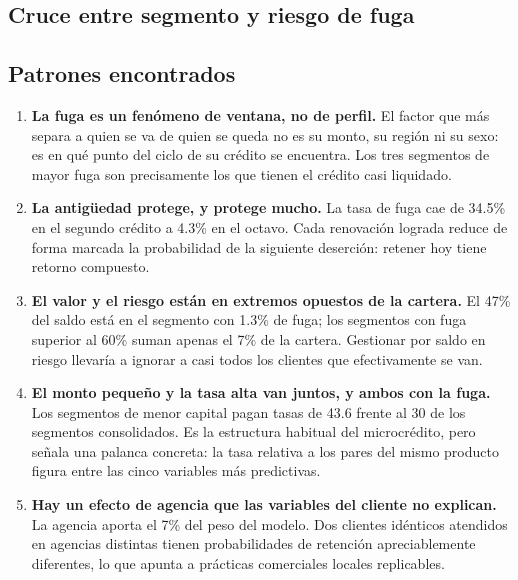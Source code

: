 \documentclass[11pt,a4paper]{article}
\newcommand{\T}[1]{}
\begin{document}
\subsection{Cruce entre segmento y riesgo de fuga}

\begin{table}[H]\centering\small
\caption{Clientes activos por segmento y nivel de riesgo, con el saldo expuesto en
riesgo alto. Es la matriz que convierte dos ejercicios separados en una sola
priorización.}
\T{cruce}
\end{table}

\subsection{Patrones encontrados}

\begin{enumerate}[leftmargin=*]
\item \textbf{La fuga es un fenómeno de ventana, no de perfil.} El factor que más
      separa a quien se va de quien se queda no es su monto, su región ni su sexo:
      es en qué punto del ciclo de su crédito se encuentra. Los tres segmentos de
      mayor fuga son precisamente los que tienen el crédito casi liquidado.
\item \textbf{La antigüedad protege, y protege mucho.} La tasa de fuga cae de
      34.5\% en el segundo crédito a 4.3\% en el octavo. Cada renovación lograda
      reduce de forma marcada la probabilidad de la siguiente deserción: retener
      hoy tiene retorno compuesto.
\item \textbf{El valor y el riesgo están en extremos opuestos de la cartera.} El
      47\% del saldo está en el segmento con 1.3\% de fuga; los segmentos con fuga
      superior al 60\% suman apenas el 7\% de la cartera. Gestionar por saldo en
      riesgo llevaría a ignorar a casi todos los clientes que efectivamente se van.
\item \textbf{El monto pequeño y la tasa alta van juntos, y ambos con la fuga.}
      Los segmentos de menor capital pagan tasas de 43.6 frente al 30 de los
      segmentos consolidados. Es la estructura habitual del microcrédito, pero
      señala una palanca concreta: la tasa relativa a los pares del mismo producto
      figura entre las cinco variables más predictivas.
\item \textbf{Hay un efecto de agencia que las variables del cliente no explican.}
      La agencia aporta el 7\% del peso del modelo. Dos clientes idénticos
      atendidos en agencias distintas tienen probabilidades de retención
      apreciablemente diferentes, lo que apunta a prácticas comerciales locales
      replicables.
\end{enumerate}
\end{document}
